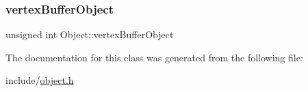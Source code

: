 \subsubsection{\texorpdfstring{vertex\+Buffer\+Object}{vertexBufferObject}}
{\footnotesize\ttfamily unsigned int Object\+::vertex\+Buffer\+Object\hspace{0.3cm}{\ttfamily [protected]}}



The documentation for this class was generated from the following file\+:\begin{DoxyCompactItemize}
\item 
include/\hyperlink{object_8h}{object.\+h}\end{DoxyCompactItemize}
